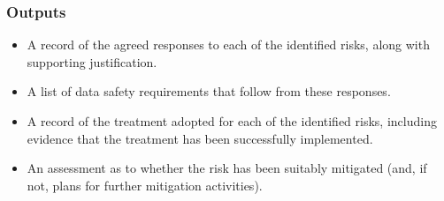 \subsubsection{Outputs}
\begin{itemize}
	\item A record of the agreed \glspl{response} to each of the identified risks, along with supporting justification.
	\item A list of \glspl{data safety requirement} that follow from these \glspl{response}.
	\item A record of the \gls{treatment} adopted for each of the identified risks, including evidence that the \gls{treatment} has been successfully implemented.
	\item An assessment as to whether the risk has been suitably mitigated (and, if not, plans for further mitigation activities).
\end{itemize}
